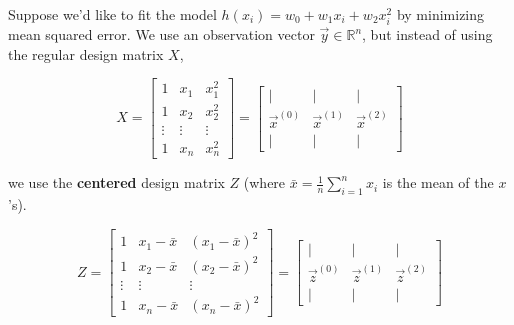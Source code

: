 \documentclass[11pt]{article}
\begin{document}
\newpage




\begin{prob}
Suppose we'd like to fit the model $\boxed{h(x_i) = w_0 + w_1 x_i + w_2 x_i^2}$ by minimizing mean squared error. We use an observation vector $\vec y \in \mathbb{R}^n$, but instead of using the regular design matrix $X$,

$$X = \begin{bmatrix} 1 & x_1 & x_1^2 \\ 1 & x_2 & x_2^2 \\ \vdots & \vdots & \vdots \\ 1 & x_n & x_n^2 \end{bmatrix} = \begin{bmatrix} | & | & | \\ \vec x^{(0)} & \vec x^{(1)} & \vec x^{(2)} \\ | & | & | \end{bmatrix}$$

we use the \textbf{centered} design matrix $Z$ (where $\bar{x} = \frac{1}{n} \sum_{i=1}^n x_i$ is the mean of the $x$'s).

$$Z = \begin{bmatrix} 1 & x_1 - \bar{x} & (x_1 - \bar{x})^2 \\ 1 & x_2 - \bar{x} & (x_2 - \bar{x})^2 \\ \vdots & \vdots & \vdots \\ 1 & x_n - \bar{x} & (x_n - \bar{x})^2 \end{bmatrix} = \begin{bmatrix} | & | & | \\ \vec z^{(0)} & \vec z^{(1)} & \vec z^{(2)} \\ | & | & | \end{bmatrix}$$


\end{prob}
\end{document}
